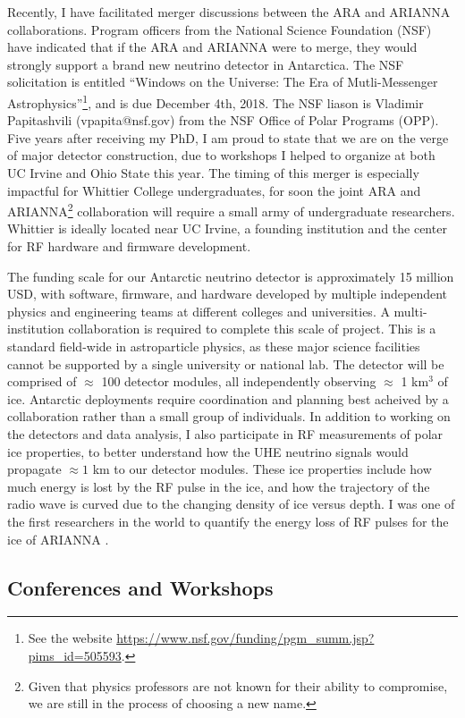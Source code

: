 \documentclass[../../main.tex]{subfiles}
\begin{document}
Recently, I have facilitated merger discussions between the ARA and ARIANNA collaborations.  Program officers from the National Science Foundation (NSF) have indicated that if the ARA and ARIANNA were to merge, they would strongly support a brand new neutrino detector in Antarctica.  The NSF solicitation is entitled ``Windows on the Universe: The Era of Mutli-Messenger Astrophysics''\footnote{See the website \url{https://www.nsf.gov/funding/pgm_summ.jsp?pims_id=505593}.}, and is due December 4th, 2018.  The NSF liason is Vladimir Papitashvili (vpapita@nsf.gov) from the NSF Office of Polar Programs (OPP).  Five years after receiving my PhD, I am proud to state that we are on the verge of major detector construction, due to workshops I helped to organize at both UC Irvine and Ohio State this year.  The timing of this merger is especially impactful for Whittier College undergraduates, for soon the joint ARA and ARIANNA\footnote{Given that physics professors are not known for their ability to compromise, we are still in the process of choosing a new name.} collaboration will require a small army of undergraduate researchers. Whittier is ideally located near UC Irvine, a founding institution and the center for RF hardware and firmware development. \\ \hspace{0.1cm}

The funding scale for our Antarctic neutrino detector is approximately 15 million USD, with software, firmware, and hardware developed by multiple independent physics and engineering teams at different colleges and universities.  A multi-institution collaboration is required to complete this scale of project.  This is a standard field-wide in astroparticle physics, as these major science facilities cannot be supported by a single university or national lab.  The detector will be comprised of $\approx$ 100 detector modules, all independently observing $\approx$ 1 km$^3$ of ice.  Antarctic deployments require coordination and planning best acheived by a collaboration rather than a small group of individuals.  In addition to working on the detectors and data analysis, I also participate in RF measurements of polar ice properties, to better understand how the UHE neutrino signals would propagate $\approx 1$ km to our detector modules.  These ice properties include how much energy is lost by the RF pulse in the ice, and how the trajectory of the radio wave is curved due to the changing density of ice versus depth.  I was one of the first researchers in the world to quantify the energy loss of RF pulses for the ice of ARIANNA \cite{hanson2015}.

\subsection{Conferences and Workshops}
\end{document}
